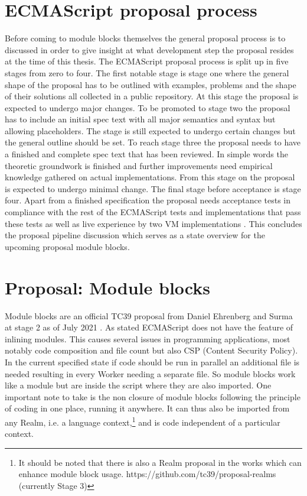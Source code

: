 \section{ECMAScript proposal process}
Before coming to module blocks themselves the general proposal process is to discussed in order to give insight at what development step the proposal resides at the time of this thesis. The ECMAScript proposal process \cite{ecmaProp} is split up in five stages from zero to four. The first notable stage is stage one where the general shape of the proposal has to be outlined with examples, problems and the shape of their solutions all collected in a public repository. At this stage the proposal is expected to undergo major changes. To be promoted to stage two the proposal has to include an initial spec text with all major semantics and syntax but allowing placeholders. The stage is still expected to undergo certain changes but the general outline should be set. To reach stage three the proposal needs to have a finished and complete spec text that has been reviewed. In simple words the theoretic groundwork is finished and further improvements need empirical knowledge gathered on actual implementations. From this stage on the proposal is expected to undergo minimal change. The final stage before acceptance is stage four. Apart from a finished specification the proposal needs acceptance tests in compliance with the rest of the ECMAScript tests and implementations that pass these tests as well as live experience by two VM implementations \cite{ecmaProp}. This concludes the proposal pipeline discussion which serves as a state overview for the upcoming proposal module blocks.

\section{Proposal: Module blocks}
Module blocks are an official TC39 proposal from Daniel Ehrenberg and Surma at stage 2 as of July 2021 \cite{gitMB}. As stated ECMAScript does not have the feature of inlining modules. This causes several issues in programming applications, most notably code composition and file count but also CSP (Content Security Policy). In the current specified state if code should be run in parallel an additional file is needed resulting in every Worker \cite{nodejs} needing a separate file. So module blocks work like a module but are inside the script where they are also imported. One important note to take is the non closure of module blocks following the principle of coding in one place, running it anywhere. It can thus also be imported from any Realm, i.e. a language context,\footnote{It should be noted that there is also a Realm proposal in the works which can enhance module block usage. https://github.com/tc39/proposal-realms (currently Stage 3)} and is code independent of a particular context. 

